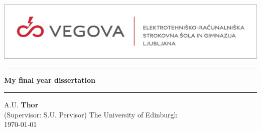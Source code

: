 \documentclass[11pt,                                          %
               a4paper,                                       %
               openright,                                     %
               twoside]{report}                               %
\newcommand{\theTitle}{My final year dissertation}            %
\newcommand{\theAuthor}{A.U.  \textbf{Thor}}                  %
\newcommand{\theSupervisor}{S.U. Pervisor}                    %
\begin{document}

\begin{titlepage}                                             %
\pagestyle{empty}                                             %
\centering                                                    %
\includegraphics[width=1.1\textwidth]{logo.jpg} \\ %
\vspace{60mm}                                                 %
\hrule\vspace{5mm}                                            %
{\LARGE \textbf{\textcolor{mygreen}{\theTitle}}} \\           %
\vspace{5mm}\hrule\vspace{20mm}                               %
{\large \theAuthor} \\ \vspace{2mm}                           %
{\large (Supervisor: \theSupervisor)}                         %
\vfill                                                        %
{\small The University of Edinburgh \\ \today}                %
\cleardoublepage                                              %
\end{titlepage}

\setcounter{page}{1}                                          %
\tableofcontents                                              %
\end{document}
